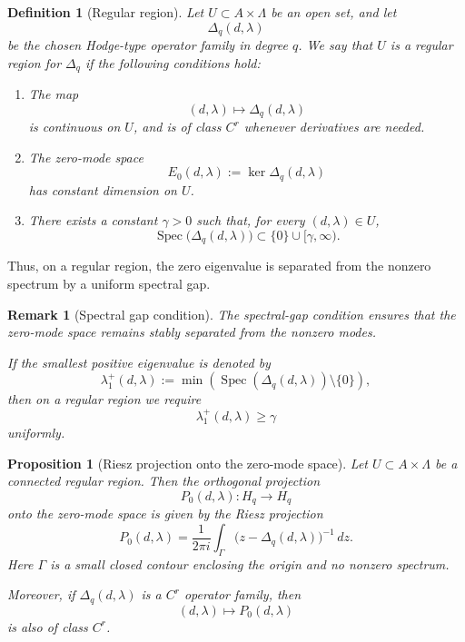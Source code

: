 \documentclass[pdflatex,sn-mathphys-num]{sn-jnl}%
\theoremstyle{thmstyleone}%
\newtheorem{proposition}[theorem]{Proposition}%
\theoremstyle{thmstyletwo}%
\newtheorem{remark}{Remark}%
\theoremstyle{thmstylethree}%
\newtheorem{definition}{Definition}%
\begin{document}
\begin{definition}[Regular region]
Let \(U\subset A\times\Lambda\) be an open set, and let
\[
\Delta_q(d,\lambda)
\]
be the chosen Hodge-type operator family in degree \(q\). We say that \(U\) is a
\emph{regular region} for \(\Delta_q\) if the following conditions hold:

\begin{enumerate}
    \item The map
    \[
    (d,\lambda)\longmapsto \Delta_q(d,\lambda)
    \]
    is continuous on \(U\), and is of class \(C^r\) whenever derivatives are
    needed.

    \item The zero-mode space
    \[
    E_0(d,\lambda):=\ker \Delta_q(d,\lambda)
    \]
    has constant dimension on \(U\).

    \item There exists a constant \(\gamma>0\) such that, for every
    \((d,\lambda)\in U\),
    \[
    \operatorname{Spec}\bigl(\Delta_q(d,\lambda)\bigr)
    \subset
    \{0\}\cup[\gamma,\infty).
    \]
\end{enumerate}
\end{definition}

Thus, on a regular region, the zero eigenvalue is separated from the nonzero
spectrum by a uniform spectral gap.

\begin{remark}[Spectral gap condition]
The spectral-gap condition ensures that the zero-mode space remains stably
separated from the nonzero modes.

If the smallest positive eigenvalue is denoted by
\[
\lambda_1^+(d,\lambda)
:=
\min\left(
\operatorname{Spec}(\Delta_q(d,\lambda))
\setminus\{0\}
\right),
\]
then on a regular region we require
\[
\lambda_1^+(d,\lambda)\ge \gamma
\]
uniformly.
\end{remark}

\begin{proposition}[Riesz projection onto the zero-mode space]
Let \(U\subset A\times\Lambda\) be a connected regular region. Then the orthogonal
projection
\[
P_0(d,\lambda):H_q\to H_q
\]
onto the zero-mode space is given by the Riesz projection
\[
P_0(d,\lambda)
=
\frac{1}{2\pi i}
\int_\Gamma
\bigl(z-\Delta_q(d,\lambda)\bigr)^{-1}\,dz.
\]
Here \(\Gamma\) is a small closed contour enclosing the origin and no nonzero
spectrum.

Moreover, if \(\Delta_q(d,\lambda)\) is a \(C^r\) operator family, then
\[
(d,\lambda)\longmapsto P_0(d,\lambda)
\]
is also of class \(C^r\).
\end{proposition}
\end{document}

